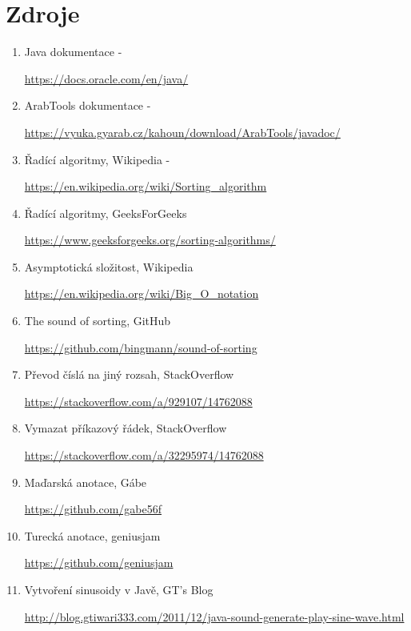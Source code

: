 \documentclass{article}
\begin{document}
\section{Zdroje}
\begin{enumerate}
  \item Java dokumentace - \par \url{https://docs.oracle.com/en/java/}
  \item ArabTools dokumentace - \par \url{https://vyuka.gyarab.cz/kahoun/download/ArabTools/javadoc/}
  \item Řadící algoritmy, Wikipedia - \par \url{https://en.wikipedia.org/wiki/Sorting_algorithm}
  \item Řadící algoritmy, GeeksForGeeks \par \url{https://www.geeksforgeeks.org/sorting-algorithms/}
  \item Asymptotická složitost, Wikipedia \par \url{https://en.wikipedia.org/wiki/Big_O_notation}
  \item The sound of sorting, GitHub \par \url{https://github.com/bingmann/sound-of-sorting}
  \item Převod číslá na jiný rozsah,  StackOverflow \par \url{https://stackoverflow.com/a/929107/14762088}
  \item Vymazat příkazový řádek, StackOverflow \par \url{https://stackoverflow.com/a/32295974/14762088}
  \item Maďarská anotace, Gábe \par \url{https://github.com/gabe56f}
  \item Turecká anotace, geniusjam \par \url{https://github.com/geniusjam}
  \item Vytvoření sinusoidy v Javě, GT's Blog \par \url{http://blog.gtiwari333.com/2011/12/java-sound-generate-play-sine-wave.html}
\end{enumerate}


\end{document}
